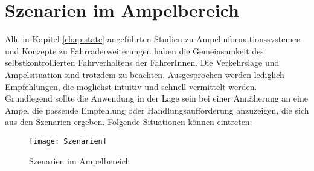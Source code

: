 \chapter{\label{chap:szenarien}Szenarien im Ampelbereich}
Alle in Kapitel \ref{chap:state} angeführten Studien zu Ampelinformationssystemen und Konzepte zu Fahrraderweiterungen haben die Gemeinsamkeit des selbstkontrollierten Fahrverhaltens der FahrerInnen. Die Verkehrslage und Ampelsituation sind trotzdem zu beachten. Ausgesprochen werden lediglich Empfehlungen, die möglichst intuitiv und schnell vermittelt werden.\\ 
Grundlegend sollte die Anwendung in der Lage sein bei einer Annäherung an eine Ampel die passende Empfehlung oder Handlungsaufforderung anzuzeigen, die sich aus den Szenarien ergeben. Folgende Situationen können eintreten:\\
\begin{figure}[H]  
    \centering  
    \texttt{[image: Szenarien]} 
    \grayRule
    \caption[Szenarien]{Szenarien im Ampelbereich}
    \label{fig:szenarien}
\end{figure} \vspace{17pt}
